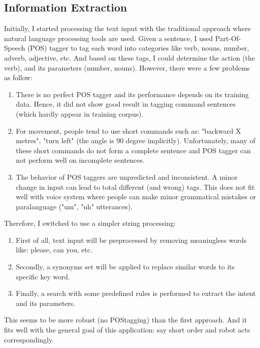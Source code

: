 \subsection{Information Extraction}
Initially, I started processing the text input with the traditional approach where natural language processing tools are used. Given a sentence, I used Part-Of-Speech (POS) tagger to tag each word into categories like verb, nouns, number, adverb, adjective, etc. And based on these tags, I could determine the action (the verb), and its parameters (number, nouns). However, there were a few problems as follow:
\begin{enumerate}
	\item There is no perfect POS tagger and its performance depends on its training data. Hence, it did not show good result in tagging command sentences (which hardly appear in training corpus).
	\item For movement, people tend to use short commands such as: "backward X metres", "turn left" (the angle is 90 degree implicitly). Unfortunately, many of these short commands do not form a complete sentence and POS tagger can not perform well on incomplete sentences.
	\item The behavior of POS taggers are unpredicted and inconsistent. A minor change in input can lead to total different (and wrong) tags. This does not fit well with voice system where people can make minor grammatical mistakes or paralanguage ("um", "uh" utterances).
\end{enumerate}
Therefore, I switched to use a simpler string processing: 
\begin{enumerate}
	\item First of all, text input will be preprocessed by removing meaningless words like: please, can you, etc.
	\item Secondly, a synonyms set will be applied to replace similar words to its specific key word. 
	\item Finally, a search with some predefined rules is performed to extract the intent and its parameters.
\end{enumerate}
This seems to be more robust (no POStagging) than the first approach. And it fits well with the general goal of this application: say short order and robot acts correspondingly.

